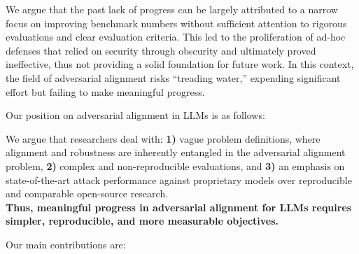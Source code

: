 We argue that the past lack of progress can be largely attributed to a narrow focus on improving benchmark numbers without sufficient attention to rigorous evaluations and clear evaluation criteria. This led to the proliferation of ad-hoc defenses that relied on security through obscurity and ultimately proved ineffective, thus not providing a solid foundation for future work. In this context, the field of adversarial alignment risks ``treading water,'' expending significant effort but failing to make meaningful progress.  



\newpage
Our position on adversarial alignment in LLMs is as follows:

\begin{tcolorbox}[
    colback=white, colframe=customblue, coltitle=white, fonttitle=\bfseries, 
    rounded corners, enhanced, 
    title=Position, 
    attach boxed title to top left={yshift=-2mm, xshift=5mm}, 
    boxed title style={colback=customblue, rounded corners},
    boxsep=0.5mm
]
 We argue that researchers deal with:\,\,\textbf{1)} vague problem definitions, where alignment and robustness are inherently entangled in the adversarial alignment problem, \textbf{2)} complex and non-reproducible evaluations, and \textbf{3)}  an emphasis on state-of-the-art attack performance against proprietary models over reproducible and comparable open-source research.\\ 
 \textbf{Thus, meaningful progress in adversarial alignment for LLMs requires simpler, reproducible, and more measurable objectives.}
\end{tcolorbox}

Our main contributions are:



